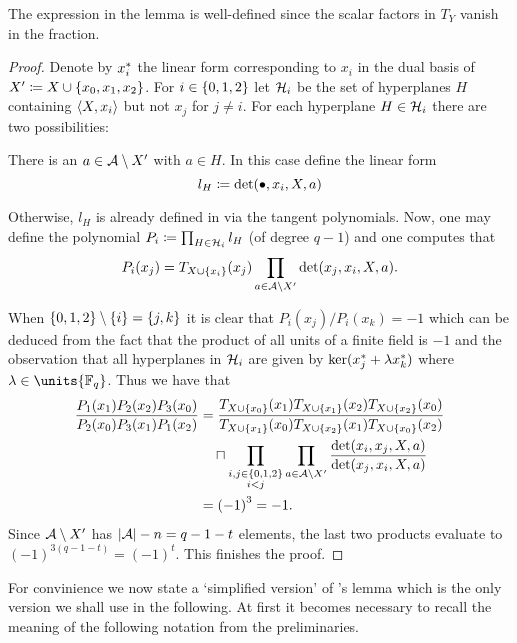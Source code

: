 \begin{remark}
    The expression in the lemma is well-defined since the scalar factors in $T_Y$ vanish in the fraction.
\end{remark}

\begin{proof}
    Denote by ${x}^{\ast}_i$ the linear form corresponding to $x_i$ in the dual basis of $X'\defeq X\setjoin\set{x_0,x_1,x_2}$.
    For $i\in\set{0,1,2}$ let $\mathcal{H}_i$ be the set of hyperplanes $H$ containing $\gen{X,x_i}$ but not $x_j$ for $j\neq i$.
    For each hyperplane $H\in \mathcal{H}_i$ there are two possibilities:
    \begin{casebycase}
        \item There is an $a\in\mathcal{A}\setminus X'$ with $a\in H$. In this case define the linear form
    $$
    l_H\mathrel{\mathrel{\mathop:}\mkern-1.2mu=} \det(\bullet,x_i,X,a)
    $$
        \item Otherwise, $l_H$ is already defined in via the tangent polynomials.
    Now, one may define the polynomial $P_i\mathrel{\mathrel{\mathop:}\mkern-1.2mu=} \prod_{H\in \mathcal{H}_i}{l_H}$ (of degree $q-1$) and one computes that
    $$
    P_i(x_j)=T_{X\setjoin\set{x_i}}(x_j)\prod_{a\in\cA\setminus X'}{\det(x_j,x_i,X,a)}.
    $$%
    \end{casebycase}
    When $\set{0,1,2}\setminus\set{i}=\set{j,k}$ it is clear that $P_i(x_j)/P_i(x_k)=-1$ which can be deduced from the fact that the product of all units of a finite field is $-1$ and the observation that all hyperplanes in $\mathcal{H}_i$ are given by $\ker({x}^{\ast}_j+\lambda {x}^{\ast}_k)$ where $\lambda\in\units{\field{q}}$.
    Thus we have that
    \begin{align*}
        \frac{P_1(x_1)P_2(x_2)P_3(x_0)}{P_2(x_0)P_3(x_1)P_1(x_2)} &= \frac{T_{X\setjoin\set{x_0}}(x_1)T_{X\setjoin\set{x_1}}(x_2)T_{X\setjoin\set{x_2}}(x_0)}{T_{X\setjoin\set{x_1}}(x_0)T_{X\setjoin\set{x_2}}(x_1)T_{X\setjoin\set{x_0}}(x_2)}\\
        & \quad\setprod\prod_{\substack{i,j\in\set{0,1,2}\\ i<j}}\prod_{a\in\cA\setminus X'}{\frac{\det(x_i,x_j,X,a)}{\det(x_j,x_i,X,a)}}\\
        & = {(-1)}^3=-1.
    \end{align*}
    Since $\mathcal{A}\setminus X'$ has $\left\vert{\mathcal{A}}\right\vert-n=q-1-t$ elements, the last two products evaluate to ${(-1)}^{3(q-1-t)}={(-1)}^t$.
    This finishes the proof.
\end{proof}

For convinience we now state a `simplified version' of 's lemma which is the only version we shall use in the following.
At first it becomes necessary to recall the meaning of the following notation from the preliminaries.

